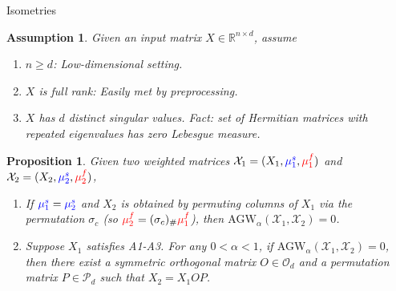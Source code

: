 \documentclass{beamer}
\newcommand{\agw}{\text{AGW}}
\newcommand{\cX}{\mathcal X}
\newcommand{\bbR}{\mathbb R}
\newcommand{\mfsrc}{{\color{red}{\mu_1^f}}}
\newcommand{\mftg}{{\color{red}{\mu_2^f}}}
\newcommand{\mssrc}{{\color{blue}{\mu_1^s}}}
\newcommand{\mstg}{{\color{blue}{\mu_2^s}}}
\newtheorem{proposition}{Proposition}[section]
\newtheorem{assumption}{Assumption}
\begin{document}
\begin{frame}{Isometries}
\scriptsize
\vspace{-0.2cm}

\begin{assumption}
  \label{assumption:1}
Given an input matrix $X \in \bbR^{n \times d}$, assume
\begin{enumerate}
  \item[(A1)] $n \geq d$: Low-dimensional setting.
  \item[(A2)] $X$ is full rank: Easily met by preprocessing.
  \item[(A3)] $X$ has $d$ distinct singular values. Fact:
  set of Hermitian matrices with repeated eigenvalues has zero Lebesgue measure.
\end{enumerate}
\end{assumption}
\begin{proposition}
  Given two weighted matrices $\cX_1 = (X_1, \mssrc, \mfsrc)$
  and $\cX_2 = (X_2, \mstg, \mftg)$,
  \begin{enumerate}
      \item[$(\Rightarrow)$] If $\mssrc = \mstg$ and
      $X_2$ is obtained by permuting columns of $X_1$ via
      the permutation $\sigma_c$ (so $\mftg = (\sigma_c)_{\#} \mfsrc$),
      then $\agw_{\alpha}(\cX_1, \cX_2) = 0$.
      \item[$(\Leftarrow)$] Suppose $X_1$ satisfies A1-A3. For any $0 < \alpha < 1$,
      if $\agw_{\alpha}(\cX_1, \cX_2) = 0$,
      then there exist a symmetric orthogonal matrix $O \in \mathcal O_d$
      and a permutation matrix $P \in \mathcal P_d$ such that $X_2 = X_1 OP$.
  \end{enumerate}
\end{proposition}
\end{frame}
\end{document}
